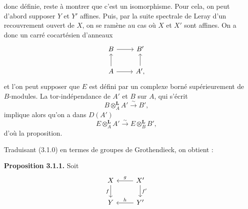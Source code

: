 donc définie, reste à montrer que c'est un isomorphisme. Pour cela, on peut d'abord supposer \(Y\) et \(Y'\) affines. Puis, par la suite spectrale de Leray d'un recouvrement ouvert de \(X\), on se ramène au cas où \(X\) et \(X'\) sont affines. On a donc un carré cocartésien d'anneaux
\[
\begin{tikzcd}
B\arrow[r] & B'\\
A\arrow[u]\arrow[r] & A'\arrow[u],
\end{tikzcd}
\]
et l'on peut supposer que \(E\) est défini par un complexe borné supérieurement de \(B\)-modules. La tor-indépendance de \(A'\) et \(B\) sur \(A\), qui s'écrit
\[
 B\otimes_A^{\mathbf L}A'\xrightarrow{\sim}B',
\]
implique alors qu'on a dans \(D(A')\)
\[
 E\otimes_A^{\mathbf L}A'\xrightarrow{\sim}E\otimes_B^{\mathbf L}B',
\]
d'où la proposition.

Traduisant (3.1.0) en termes de groupes de Grothendieck, on obtient :

\textbf{Proposition 3.1.1.} Soit
\[
\begin{tikzcd}
X \arrow[d,"f"'] & X' \arrow[l,"g"']\arrow[d,"f'"]\\
Y & Y' \arrow[l,"h"']
\end{tikzcd}
\]
